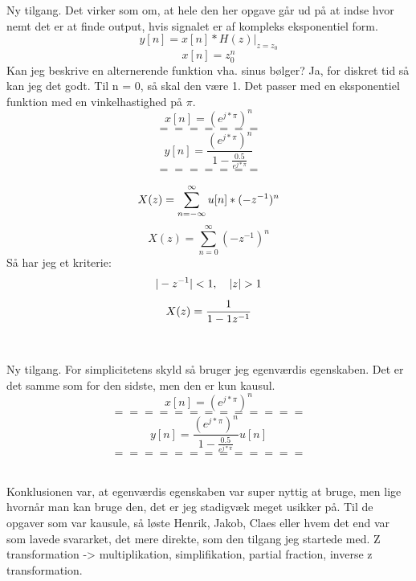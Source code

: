 \begin{Opgaver}
\begin{kapitel}[Z transformation]
\begin{Opgave}
\begin{UnderOpgave}[\text{$x[n] = (-1)^n,\tab{0} -\infty < n < \infty$}]
                \color{black}
                Ny tilgang. Det virker som om, at hele den her opgave går ud på at indse hvor nemt det er at finde output, hvis signalet er af kompleks eksponentiel form. 
                \[y[n] = x[n]*H(z)|_{z=z_0}\]
                \[x[n] = z_0^n\]
                Kan jeg beskrive en alternerende funktion vha. sinus bølger? Ja, for diskret tid så kan jeg det godt.
                Til n = 0, så skal den være 1. Det passer med en eksponentiel funktion med en vinkelhastighed på $\pi$. 
                \[x[n] = (e^{j*\pi})^n\]
                \[=======\]
                \[y[n] = \frac{(e^{j*\pi})^n}{1 - \frac{0.5}{e^{j*\pi}}}\]
                \[=======\]
            \end{UnderOpgave}
            \begin{UnderOpgave}[\text{$x[n] = (-1)^nu[n]$}]
                \color{red}
                \[X(z) = \sum_{n = -\infty}^{\infty}{u[n]*(-z^{-1})^n}\]
                \[X(z) = \sum_{n=0}^{\infty}{(-z^{-1})^n}\]
                Så har jeg et kriterie: 
                \[|-z^{-1}| < 1,\tab{0} |z| > 1\] 
                \[X(z) = \filterZ{1}{1, -1}\]\\\\
                \color{black}
                Ny tilgang. For simplicitetens skyld så bruger jeg egenværdis egenskaben. 
                Det er det samme som for den sidste, men den er kun kausul. 
                \[x[n] = (e^{j*\pi})^n\]
                \[=============\]
                \[y[n] = \frac{(e^{j*\pi})^n}{1 - \frac{0.5}{e^{j*\pi}}}u[n]\]
                \[=============\]
            \end{UnderOpgave}\\
            Konklusionen var, at egenværdis egenskaben var super nyttig at bruge, men lige hvornår man kan bruge den, det er jeg stadigvæk meget usikker på. 
            Til de opgaver som var kausule, så løste Henrik, Jakob, Claes eller hvem det end var som lavede svararket, det mere direkte, som den tilgang jeg startede med.
            Z transformation -> multiplikation, simplifikation, partial fraction, inverse z transformation. 


\end{Opgave}
\end{kapitel}
\end{Opgaver}
